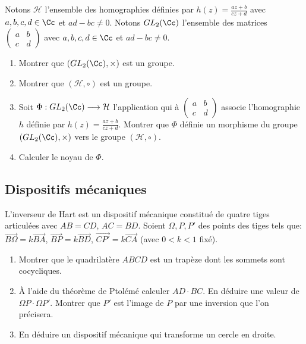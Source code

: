 \documentclass[11pt,class=report,crop=false]{standalone}
\begin{document}
\begin{exercicecours}
Notons $\mathcal{H}$ l'ensemble des homographies définies par $h(z)= \frac{az+b}{cz+d}$ avec $a,b,c,d \in \Cc$ et $ad-bc \neq 0$.
Notons $GL_2(\Cc)$ l'ensemble des matrices $\left(\begin{smallmatrix} a & b \\ c & d \end{smallmatrix}\right)$ avec
$a,b,c,d \in \Cc$ et $ad-bc \neq 0$.
\begin{enumerate}
 \item Montrer que $(GL_2(\Cc),\times)$ est un groupe.
 \item Montrer que $(\mathcal{H},\circ)$ est un groupe.
 \item Soit $\Phi : GL_2(\Cc) \longrightarrow \mathcal{H}$ l'application qui à 
 $\left(\begin{smallmatrix} a & b \\ c & d \end{smallmatrix}\right)$ associe l'homographie $h$ définie par $h(z)= \frac{az+b}{cz+d}$.
 Montrer que $\Phi$ définie un morphisme du groupe $(GL_2(\Cc),\times)$ vers le groupe $(\mathcal{H},\circ)$.
 \item Calculer le noyau de $\Phi$.
\end{enumerate}
\end{exercicecours}


\subsection{Dispositifs mécaniques}


\begin{exercicecours}
\label{exo:inversion_hart}
L'inverseur de Hart est un dispositif mécanique constitué de quatre tiges articulées avec
$AB=CD$, $AC=BD$. Soient $\Omega, P, P'$ des points des tiges tels que:
$\overrightarrow{B\Omega} = k \overrightarrow{BA}$, $\overrightarrow{BP} = k \overrightarrow{BD}$,
 $\overrightarrow{CP'} = k \overrightarrow{CA}$ (avec $0< k < 1$ fixé).

\begin{enumerate}
 \item Montrer que le quadrilatère $ABCD$ est un trapèze dont les sommets sont cocycliques.
 
 \item \`A l'aide du théorème de Ptolémé calculer $AD\cdot BC$. En déduire une valeur de $\Omega P\cdot \Omega P'$.
 Montrer que $P'$ est l'image de  $P$ par une inversion que l'on précisera.
 
 \item En déduire un dispositif mécanique qui transforme un cercle en droite.
\end{enumerate} 

\end{exercicecours}
\end{document}
